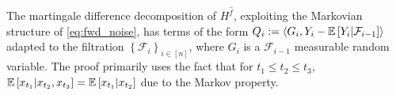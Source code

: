 
The martingale difference decomposition of $H^{\hat{f}}$, exploiting the Markovian structure of \eqref{eq:fwd_noise}, has terms of the form $Q_{i} := \left\langle G_{i}, Y_{i}-\mathbb{E}\left[Y_{i}|\mathcal{F}_{i-1}\right]\right\rangle$ adapted to the filtration $\left\{\mathcal{F}_{i}\right\}_{i \in [n]}$, where $G_i$ is a $\mathcal{F}_{i-1}$ measurable random variable. The proof  primarily uses the fact that for $t_{1} \leq t_{2} \leq t_{3}$, $\mathbb{E}\left[x_{t_1}|x_{t_2}, x_{t_3}\right] = \mathbb{E}\left[x_{t_1}|x_{t_2}\right]$ due to the Markov property. 




